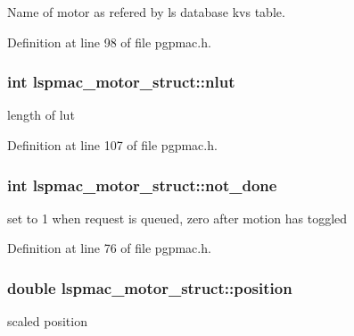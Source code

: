 Name of motor as refered by ls database kvs table. 



Definition at line 98 of file pgpmac.\-h.

\hypertarget{structlspmac__motor__struct_a11cbc6f50c150ed446e9a901cf7cc12b}{
\subsubsection[{nlut}]{\setlength{\rightskip}{0pt plus 5cm}int lspmac\-\_\-motor\-\_\-struct\-::nlut}}\label{structlspmac__motor__struct_a11cbc6f50c150ed446e9a901cf7cc12b}


length of lut 



Definition at line 107 of file pgpmac.\-h.

\hypertarget{structlspmac__motor__struct_ab7bd8bff48953ce05c758598d75877ac}{
\subsubsection[{not\-\_\-done}]{\setlength{\rightskip}{0pt plus 5cm}int lspmac\-\_\-motor\-\_\-struct\-::not\-\_\-done}}\label{structlspmac__motor__struct_ab7bd8bff48953ce05c758598d75877ac}


set to 1 when request is queued, zero after motion has toggled 



Definition at line 76 of file pgpmac.\-h.

\hypertarget{structlspmac__motor__struct_af8ffb3aed907d8664b65b37601954411}{
\subsubsection[{position}]{\setlength{\rightskip}{0pt plus 5cm}double lspmac\-\_\-motor\-\_\-struct\-::position}}\label{structlspmac__motor__struct_af8ffb3aed907d8664b65b37601954411}


scaled position 



